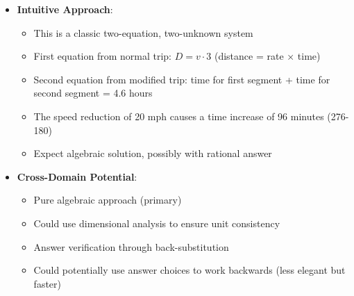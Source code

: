 \documentclass[11pt]{article}
\begin{document}
\begin{problemconfigbox}
\begin{itemize}[leftmargin=*]
    \item \textbf{Intuitive Approach}: 
    \begin{itemize}[leftmargin=*]
        \item This is a classic two-equation, two-unknown system
        \item First equation from normal trip: $D = v \cdot 3$ (distance = rate × time)
        \item Second equation from modified trip: time for first segment + time for second segment = 4.6 hours
        \item The speed reduction of 20 mph causes a time increase of 96 minutes (276-180)
        \item Expect algebraic solution, possibly with rational answer
    \end{itemize}
    
    \item \textbf{Cross-Domain Potential}: 
    \begin{itemize}[leftmargin=*]
        \item Pure algebraic approach (primary)
        \item Could use dimensional analysis to ensure unit consistency
        \item Answer verification through back-substitution
        \item Could potentially use answer choices to work backwards (less elegant but faster)
    \end{itemize}
\end{itemize}
\end{problemconfigbox}
\end{document}

